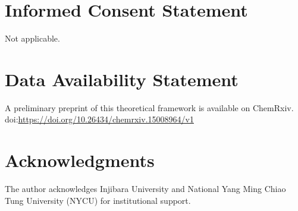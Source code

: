 \documentclass[11pt]{article}
\begin{document}
\section*{Informed Consent Statement}
Not applicable.

\section*{Data Availability Statement}
A preliminary preprint of this theoretical framework is available on ChemRxiv.
\newblock doi:\url{https://doi.org/10.26434/chemrxiv.15008964/v1}

\section*{Acknowledgments}
The author acknowledges Injibara University and National Yang Ming Chiao Tung University (NYCU) for institutional support.
\end{document}
